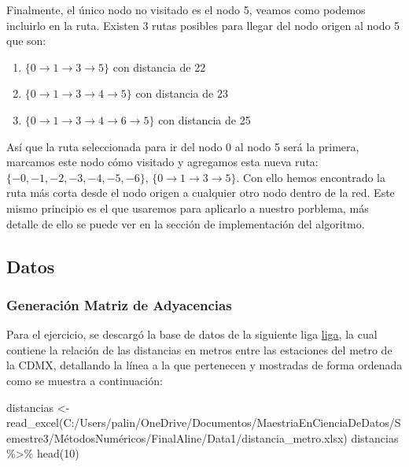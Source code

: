 \documentclass[
]{article}
\newenvironment{Shaded}{\begin{snugshade}}{\end{snugshade}}
\newcommand{\DecValTok}[1]{\textcolor[rgb]{0.00,0.00,0.81}{#1}}
\newcommand{\FunctionTok}[1]{\textcolor[rgb]{0.00,0.00,0.00}{#1}}
\newcommand{\NormalTok}[1]{#1}
\newcommand{\OtherTok}[1]{\textcolor[rgb]{0.56,0.35,0.01}{#1}}
\newcommand{\SpecialCharTok}[1]{\textcolor[rgb]{0.00,0.00,0.00}{#1}}
\newcommand{\StringTok}[1]{\textcolor[rgb]{0.31,0.60,0.02}{#1}}
\providecommand{\tightlist}{%
  \setlength{\itemsep}{0pt}\setlength{\parskip}{0pt}}
\begin{document}
Finalmente, el único nodo no visitado es el nodo 5, veamos como podemos
incluirlo en la ruta. Existen 3 rutas posibles para llegar del nodo
origen al nodo 5 que son:

\begin{enumerate}
\def\labelenumi{\arabic{enumi}.}
\tightlist
\item
  \(\{0 \rightarrow 1 \rightarrow 3 \rightarrow 5\}\) con distancia de
  22
\item
  \(\{0 \rightarrow 1 \rightarrow 3 \rightarrow 4 \rightarrow 5\}\) con
  distancia de 23
\item
  \(\{0 \rightarrow 1 \rightarrow 3 \rightarrow 4 \rightarrow 6 \rightarrow 5\}\)
  con distancia de 25
\end{enumerate}

Así que la ruta seleccionada para ir del nodo 0 al nodo 5 será la
primera, marcamos este nodo cómo visitado y agregamos esta nueva ruta:
\(\{-0,-1,-2,-3,-4,-5,-6 \}\),
\(\{0 \rightarrow 1 \rightarrow 3 \rightarrow 5\}\). Con ello hemos
encontrado la ruta más corta desde el nodo origen a cualquier otro nodo
dentro de la red. Este mismo principio es el que usaremos para aplicarlo
a nuestro porblema, más detalle de ello se puede ver en la sección de
implementación del algoritmo.

\hypertarget{datos}{%
\subsection{Datos}\label{datos}}

\hypertarget{generaciuxf3n-matriz-de-adyacencias}{%
\subsubsection{Generación Matriz de
Adyacencias}\label{generaciuxf3n-matriz-de-adyacencias}}

Para el ejercicio, se descargó la base de datos de la siguiente liga
\href{https://metro.cdmx.gob.mx/longitud-de-estacion}{liga}, la cual
contiene la relación de las distancias en metros entre las estaciones
del metro de la CDMX, detallando la línea a la que pertenecen y
mostradas de forma ordenada como se muestra a continuación:

\begin{Shaded}
\begin{Highlighting}[]
\NormalTok{distancias }\OtherTok{\textless{}{-}}\FunctionTok{read\_excel}\NormalTok{(}\StringTok{\textquotesingle{}C:/Users/palin/OneDrive/Documentos/MaestriaEnCienciaDeDatos/Semestre3/MétodosNuméricos/FinalAline/Data1/distancia\_metro.xlsx\textquotesingle{}}\NormalTok{)}
\NormalTok{distancias }\SpecialCharTok{\%\textgreater{}\%} \FunctionTok{head}\NormalTok{(}\DecValTok{10}\NormalTok{)}
\end{Highlighting}
\end{Shaded}
\end{document}
